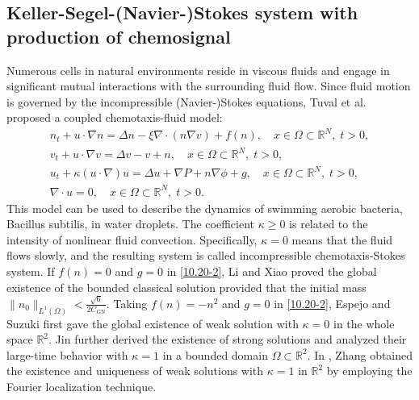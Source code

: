 \documentclass[reqno]{amsart}
\begin{document}
\subsection*{Keller-Segel-(Navier-)Stokes system with production of chemosignal}
Numerous cells in natural environments reside in viscous fluids and engage in 
significant mutual interactions with the surrounding fluid flow. Since fluid motion 
is governed by the incompressible (Navier-)Stokes equations, 
Tuval et al.\ \cite{Tuval-2005} proposed a coupled chemotaxis-fluid model:
\begin{equation}\label{10.20-2}
\begin{gathered}
n_t + u \cdot \nabla n = \Delta n -\xi\nabla\cdot(n \nabla v)  + f(n), \quad
 x \in \Omega\subset \mathbb{R}^N,\; t > 0, \\
v_t + u \cdot \nabla v = \Delta v - v + n, \quad
 x \in \Omega\subset \mathbb{R}^N,\; t > 0, \\
u_t +\kappa (u\cdot \nabla) u = \Delta u + \nabla P + n \nabla \phi +g, \quad
 x \in \Omega\subset \mathbb{R}^N,\; t > 0, \\
\nabla \cdot u = 0, \quad x \in \Omega\subset \mathbb{R}^N,\; t > 0.
\end{gathered}
\end{equation}
This model can be used to describe the dynamics of swimming aerobic bacteria, 
Bacillus subtilis, in water droplets. 
The coefficient $\kappa\geq 0$ is related to the intensity of nonlinear fluid 
convection. Specifically, $\kappa = 0$ means that the fluid flows slowly, and the
resulting system is called incompressible chemotaxis-Stokes system. 
If $ f(n)=0 $ and $ g=0 $ in \eqref{10.20-2}, Li and Xiao \cite{s1468} proved the 
global existence of the bounded classical solution provided that the initial mass
$\|n_0\|_{L^{1}(\Omega)} < \frac{\sqrt{6}}{2 C_{\mathrm{GN}}}$. 
Taking $ f(n)=-n^2$ and $g=0$ in \eqref{10.20-2}, Espejo and Suzuki \cite{Espejo} 
first gave the global existence of weak solution with $\kappa=0$ in the whole space
$\mathbb{R}^2$. Jin \cite{Jin} further derived the existence of strong solutions and 
analyzed their large-time behavior with $\kappa = 1$ in a bounded domain 
$\Omega\subset \mathbb{R}^2 $. In \cite{Zhang}, Zhang obtained the existence and 
uniqueness of weak solutions with $\kappa=1$ in $\mathbb{R}^2$ by employing the 
Fourier localization technique.
\end{document}
